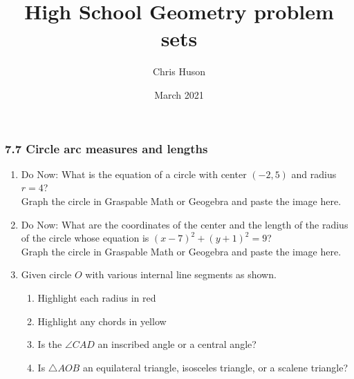 \documentclass[12pt, twoside]{article}
\title{High School Geometry problem sets}
\author{Chris Huson}
\date{March 2021}
\begin{document}
\subsubsection*{7.7 Circle arc measures and lengths}
\begin{enumerate}
\item Do Now: What is the equation of a circle with center $(-2,5)$ and radius $r=4$?\\[0.5cm]
Graph the circle in Graspable Math or Geogebra and paste the image here.

\newpage
\item Do Now: What are the coordinates of the center and the length of the radius of the circle whose equation is $(x-7)^2+(y+1)^2=9$?\\[0.5cm]
Graph the circle in Graspable Math or Geogebra and paste the image here.

\newpage
\item Given circle $O$ with various internal line segments as shown.
    \begin{multicols}{2}
    \raggedcolumns
    \begin{enumerate}[itemsep=0.5cm]
      \item Highlight each radius in red
      \item Highlight any chords in yellow
      \item Is the $\angle CAD$ an inscribed angle or a central angle?
      \item Is $\triangle AOB$ an equilateral triangle, isosceles triangle, or a scalene triangle?
      
    \end{enumerate}
    \end{multicols}


\end{enumerate}
\end{document}
